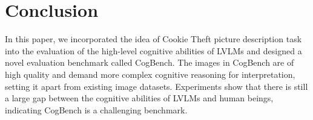 \section{Conclusion}

In this paper, we incorporated the idea of Cookie Theft picture description task into the evaluation of the high-level cognitive abilities of LVLMs and designed a novel evaluation benchmark called CogBench.
The images in CogBench are of high quality and demand more complex cognitive reasoning for interpretation, setting it apart from existing image datasets.
Experiments show that there is still a large gap between the cognitive abilities of LVLMs and human beings, indicating CogBench is a challenging benchmark.

